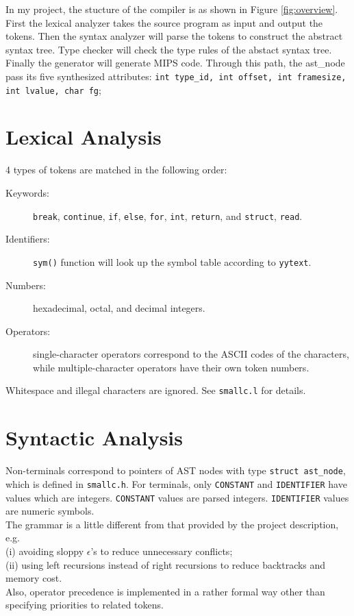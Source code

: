 \documentclass[a4paper]{article}
\begin{document}
In my project, the stucture of the compiler is as shown in Figure \ref{fig:overview}. First the lexical analyzer takes the source program as input and output the tokens. Then the syntax analyzer will parse the tokens to construct the abstract syntax tree. Type checker will check the type rules of the abstact syntax tree. Finally the generator will generate MIPS code. Through this path, the ast\_node pass its five synthesized attributes: \texttt{int type\_id, int offset, int framesize, int lvalue, char fg};




\section{Lexical Analysis}

4 types of tokens are matched in the following order:
\begin{description}
  \item[Keywords:] \texttt{break}, \texttt{continue}, \texttt{if}, \texttt{else}, \texttt{for}, \texttt{int}, \texttt{return}, and \texttt{struct}, \texttt{read}.
  \item[Identifiers:] \texttt{sym()} function will look up the symbol table according to \texttt{yytext}.
  \item[Numbers:] hexadecimal, octal, and decimal integers.
  \item[Operators:] single-character operators correspond to the ASCII codes of the characters, while multiple-character operators have their own token numbers.
\end{description}
Whitespace and illegal characters are ignored. See \texttt{smallc.l} for details.



\section{Syntactic Analysis}

Non-terminals correspond to pointers of AST nodes with type \texttt{struct ast\_node}, which is defined in \texttt{smallc.h}.
For terminals, only \texttt{CONSTANT} and \texttt{IDENTIFIER} have values which are integers.
\texttt{CONSTANT} values are parsed integers. \texttt{IDENTIFIER} values are numeric symbols.\\

The grammar is a little different from that provided by the project description, e.g.\\
(i) avoiding sloppy $\epsilon$'s to reduce unnecessary conflicts;\\
(ii) using left recursions instead of right recursions to reduce backtracks and memory cost.\\
Also, operator precedence is implemented in a rather formal way other than specifying priorities to related tokens.\\
\end{document}
